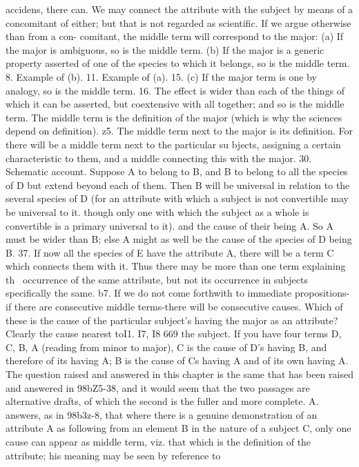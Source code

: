 {{{{{{{{{{{{{{{{{{{{{{{{{{{{{{{{{{{{{{{{{{{{{{{{{{{{{{{{{{{{{{{{{{{{{{{accidens, there can. We may connect the attribute with the
subject by means of a concomitant of either; but that is not
regarded as scientific. If we argue otherwise than from a con-
comitant, the middle term will correspond to the major: (a) If
the major is ambiguous, so is the middle term. (b) If the major
is a generic property asserted of one of the species to which it
belongs, so is the middle term.
8. Example of (b).
11. Example of (a).
15. (c) If the major term is one by analogy, so is the middle
term.
16. The effect is wider than each of the things of which it can
be asserted, but coextensive with all together; and so is the
middle term. The middle term is the definition of the major
(which is why the sciences depend on definition).
z5. The middle term next to the major is its definition. For
there will be a middle term next to the particular su bjects, assigning
a certain characteristic to them, and a middle connecting this
with the major.
30. Schematic account. Suppose A to belong to B, and B to
belong to all the species of D but extend beyond each of them.
Then B will be universal in relation to the several species of D
(for an attribute with which a subject is not convertible may be
universal to it. though only one with which the subject as a whole
is convertible is a primary universal to it). and the cause of their
being A. So A must be wider than B; else A might as well be
the cause of the species of D being B.
37. If now all the species of E have the attribute A, there will
be a term C which connects them with it. Thus there may be
more than one term explaining th~ occurrence of the same
attribute, but not its occurrence in subjects specifically the same.
b7. If we do not come forthwith to immediate propositions-
if there are consecutive middle terms-there will be consecutive
causes. Which of these is the cause of the particular subject's
having the major as an attribute? Clearly the cause nearest toI1. I7, I8
669
the subject. If you have four terms D, C, B, A (reading from
minor to major), C is the cause of D's having B, and therefore of
its having A; B is the cause of Cs having A and of its own
having A.
The question raised and answered in this chapter is the same
that has been raised and answered in 98bZ5-38, and it would seem
that the two passages are alternative drafts, of which the second
is the fuller and more complete. A. answers, as in 98b3z-8, that
where there is a genuine demonstration of an attribute A as
following from an element B in the nature of a subject C, only
one cause can appear as middle term, viz. that which is the
definition of the attribute; his meaning may be seen by reference to
}}}}}}}}}}}}}}}}}}}}}}}}}}}}}}}}}}}}}}}}}}}}}}}}}}}}}}}}}}}}}}}}}}}}}}}
